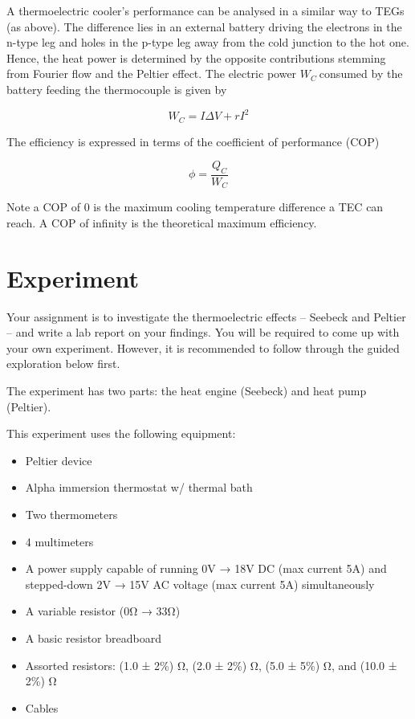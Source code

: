 \documentclass[
  letterpaper,
  DIV=11,
  numbers=noendperiod]{scrreprt}
\begin{document}
A thermoelectric cooler's performance can be analysed in a similar way
to TEGs (as above). The difference lies in an external battery driving
the electrons in the n-type leg and holes in the p-type leg away from
the cold junction to the hot one. Hence, the heat power is determined by
the opposite contributions stemming from Fourier flow and the Peltier
effect. The electric power \(W_{C}\ \)consumed by the battery feeding
the thermocouple is given by

\[W_{C} = I\Delta V + rI^{2}\]

The efficiency is expressed in terms of the coefficient of performance
(COP)

\[\phi = \frac{Q_{C}}{W_{C}}\]

Note a COP of 0 is the maximum cooling temperature difference a TEC can
reach. A COP of infinity is the theoretical maximum efficiency.


\hypertarget{experiment}{%
\chapter{Experiment}\label{experiment}}

Your assignment is to investigate the thermoelectric effects -- Seebeck
and Peltier -- and write a lab report on your findings. You will be
required to come up with your own experiment. However, it is recommended
to follow through the guided exploration below first.

The experiment has two parts: the heat engine (Seebeck) and heat pump
(Peltier).

This experiment uses the following equipment:

\begin{itemize}
\item
  Peltier device
\item
  Alpha immersion thermostat w/ thermal bath
\item
  Two thermometers
\item
  4 multimeters
\item
  A power supply capable of running 0V → 18V DC (max current 5A) and
  stepped-down 2V → 15V AC voltage (max current 5A) simultaneously
\item
  A variable resistor (0Ω → 33Ω)
\item
  A basic resistor breadboard
\item
  Assorted resistors: (1.0 ± 2\%) Ω, (2.0 ± 2\%) Ω, (5.0 ± 5\%) Ω, and
  (10.0 ± 2\%) Ω
\item
  Cables
\end{itemize}
\end{document}
